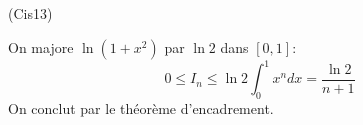 \begin{tiny}(Cis13)\end{tiny} On majore $\ln(1+x^2)$ par $\ln 2$ dans $[0,1]$:
\begin{displaymath}
 0\leq I_n \leq \ln 2 \int_{0}^1x^n dx = \frac{\ln 2}{n+1}
\end{displaymath}
On conclut par le théorème d'encadrement.
